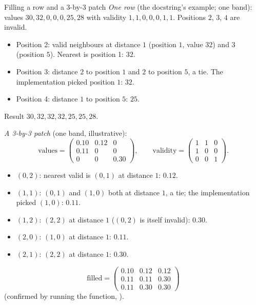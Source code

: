 \begin{worked}[label={we:bandpipeline:fill}]{Filling a row and a 3-by-3 patch}
\emph{One row} (the docstring's example; one band): values $30, 32, 0, 0, 0, 25, 28$ with validity
$1, 1, 0, 0, 0, 1, 1$. Positions $2$, $3$, $4$ are invalid.
\begin{itemize}
\item Position 2: valid neighbours at distance $1$ (position $1$, value $32$) and $3$ (position $5$).
Nearest is position 1: $32$.
\item Position 3: distance $2$ to position $1$ and $2$ to position $5$, a tie. The implementation
picked position $1$: $32$.
\item Position 4: distance $1$ to position $5$: $25$.
\end{itemize}
Result $30, 32, 32, 32, 25, 25, 28$\tagC.

\emph{A 3-by-3 patch} (one band, illustrative\tagA):
\[
\text{values} = \begin{pmatrix} 0.10 & 0.12 & 0 \\ 0.11 & 0 & 0 \\ 0 & 0 & 0.30 \end{pmatrix},\qquad
\text{validity} = \begin{pmatrix} 1 & 1 & 0 \\ 1 & 0 & 0 \\ 0 & 0 & 1 \end{pmatrix}.
\]
\begin{itemize}
\item $(0,2)$: nearest valid is $(0,1)$ at distance $1$: $0.12$.
\item $(1,1)$: $(0,1)$ and $(1,0)$ both at distance $1$, a tie; the implementation picked $(1,0)$:
$0.11$.
\item $(1,2)$: $(2,2)$ at distance $1$ ($(0,2)$ is itself invalid): $0.30$.
\item $(2,0)$: $(1,0)$ at distance $1$: $0.11$.
\item $(2,1)$: $(2,2)$ at distance $1$: $0.30$.
\end{itemize}
\[
\text{filled} = \begin{pmatrix} 0.10 & 0.12 & 0.12 \\ 0.11 & 0.11 & 0.30 \\ 0.11 & 0.30 & 0.30 \end{pmatrix}
\]
(confirmed by running the function, )\tagC.
\end{worked}

